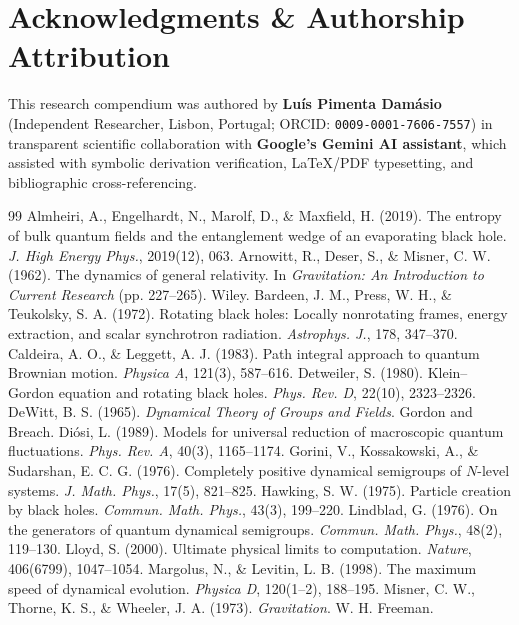 \documentclass[11pt,a4paper]{article}
\begin{document}
\section{Acknowledgments \& Authorship Attribution}
This research compendium was authored by \textbf{Lu\'is Pimenta Dam\'asio} (Independent Researcher, Lisbon, Portugal; ORCID: \texttt{0009-0001-7606-7557}) in transparent scientific collaboration with \textbf{Google's Gemini AI assistant}, which assisted with symbolic derivation verification, \LaTeX{}/PDF typesetting, and bibliographic cross-referencing.

\begin{thebibliography}{99}
\small
{} Almheiri, A., Engelhardt, N., Marolf, D., \& Maxfield, H. (2019). The entropy of bulk quantum fields and the entanglement wedge of an evaporating black hole. \textit{J. High Energy Phys.}, 2019(12), 063.
 Arnowitt, R., Deser, S., \& Misner, C. W. (1962). The dynamics of general relativity. In \textit{Gravitation: An Introduction to Current Research} (pp. 227--265). Wiley.
 Bardeen, J. M., Press, W. H., \& Teukolsky, S. A. (1972). Rotating black holes: Locally nonrotating frames, energy extraction, and scalar synchrotron radiation. \textit{Astrophys. J.}, 178, 347--370.
 Caldeira, A. O., \& Leggett, A. J. (1983). Path integral approach to quantum Brownian motion. \textit{Physica A}, 121(3), 587--616.
 Detweiler, S. (1980). Klein--Gordon equation and rotating black holes. \textit{Phys. Rev. D}, 22(10), 2323--2326.
 DeWitt, B. S. (1965). \textit{Dynamical Theory of Groups and Fields}. Gordon and Breach.
 Di\'osi, L. (1989). Models for universal reduction of macroscopic quantum fluctuations. \textit{Phys. Rev. A}, 40(3), 1165--1174.
 Gorini, V., Kossakowski, A., \& Sudarshan, E. C. G. (1976). Completely positive dynamical semigroups of $N$-level systems. \textit{J. Math. Phys.}, 17(5), 821--825.
 Hawking, S. W. (1975). Particle creation by black holes. \textit{Commun. Math. Phys.}, 43(3), 199--220.
 Lindblad, G. (1976). On the generators of quantum dynamical semigroups. \textit{Commun. Math. Phys.}, 48(2), 119--130.
 Lloyd, S. (2000). Ultimate physical limits to computation. \textit{Nature}, 406(6799), 1047--1054.
 Margolus, N., \& Levitin, L. B. (1998). The maximum speed of dynamical evolution. \textit{Physica D}, 120(1--2), 188--195.
 Misner, C. W., Thorne, K. S., \& Wheeler, J. A. (1973). \textit{Gravitation}. W. H. Freeman.

\end{thebibliography}
\end{document}
